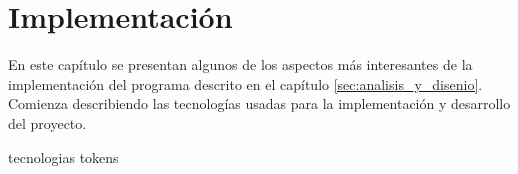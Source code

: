 %
%
%

\chapter{Implementación}
\label{sec:implementacion}

En este capítulo se presentan algunos de los aspectos más interesantes de
la implementación del programa descrito en el capítulo
\ref{sec:analisis_y_disenio}. Comienza describiendo las tecnologías
usadas para la implementación y desarrollo del proyecto.

{tecnologias}
{tokens}
